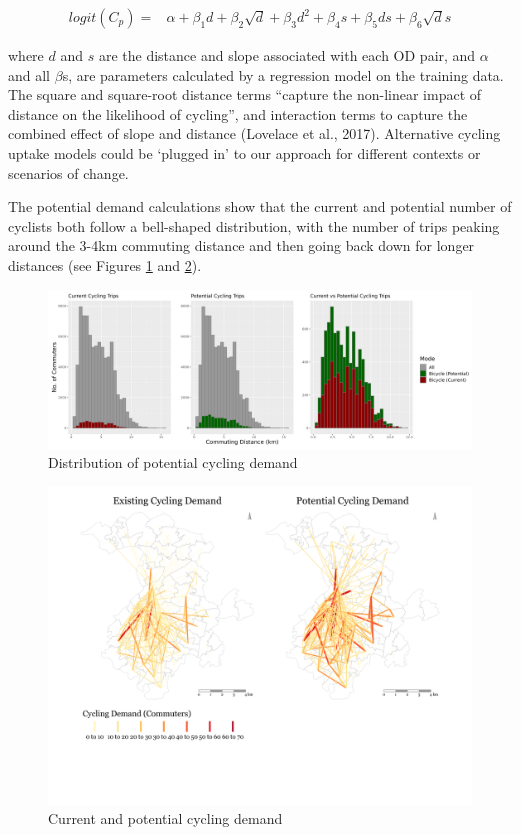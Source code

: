 \documentclass[
]{article}
\begin{document}
\begin{align}\label{eq:pcteqn}
     logit(C_{p}) = & \alpha + \beta_1 d + \beta_2 \sqrt{d} + \beta_3 d^2 + \beta_4 s + \beta_5 ds + \beta_6 \sqrt{d}s 
\end{align}

\noindent where \(d\) and \(s\) are the distance and slope associated with each
OD pair, and \(\alpha\) and all \(\beta\)s, are parameters calculated by a regression
model on the training data. The square and square-root distance terms
``capture the non-linear impact of distance on the likelihood of
cycling'', and interaction terms to capture the combined effect of slope
and distance (Lovelace et al., 2017). Alternative cycling uptake
models could be `plugged in' to our approach for different contexts or scenarios of change.

The potential demand calculations show that the current and potential
number of cyclists both follow a bell-shaped distribution, with the
number of trips peaking around the 3-4km commuting distance and then
going back down for longer distances (see Figures
\ref{fig:potdemhistograms} and \ref{fig:desirefacetcycling}).

\begin{figure}

{\centering \includegraphics[width=1\linewidth]{data/Manchester/Plots/histogram_distance_cycling_potential_current_all} 

}

\caption{Distribution of potential cycling demand}\label{fig:potdemhistograms}
\end{figure}

\begin{figure}[H]

{\centering \includegraphics[width=0.65\linewidth]{data/Manchester/Plots/desire_facet_cycling} 

}

\caption{Current and potential cycling demand}\label{fig:desirefacetcycling}
\end{figure}
\end{document}
